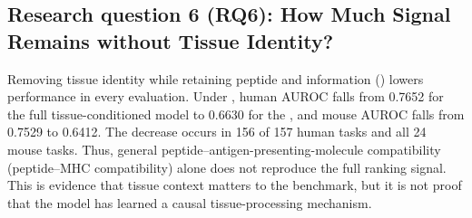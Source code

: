 \FloatBarrier
\subsection{Research question 6 (RQ6): How Much Signal Remains without Tissue Identity?}

Removing tissue identity while retaining peptide and \plainMHC{} information (\plainMHCOnly{}) lowers performance in every evaluation. Under \plainPeptideOOF{}, human AUROC falls from 0.7652 for the full tissue-conditioned model to 0.6630 for the \plainMHCOnly{}, and mouse AUROC falls from 0.7529 to 0.6412. The decrease occurs in 156 of 157 human tasks and all 24 mouse tasks. Thus, general peptide--antigen-presenting-molecule compatibility (peptide--MHC compatibility) alone does not reproduce the full ranking signal. This is evidence that tissue context matters to the benchmark, but it is not proof that the model has learned a causal tissue-processing mechanism.

